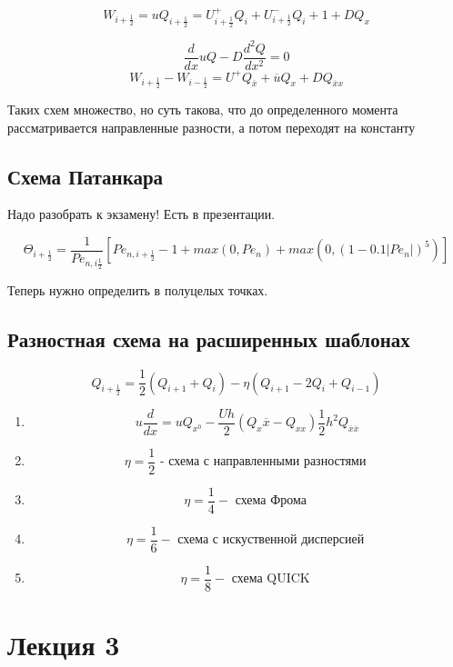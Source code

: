 \documentclass[12pt, a4paper]{article}
\begin{document}
\[ W_{i+\frac{1}{2}} = u Q_{i+\frac{1}{2}} = U^+_{i+\frac{1}{2}} Q_i + U^-_{i+\frac{1}{2}} Q_i+1 + D Q_x \]

\[ \frac{d }{dx }u Q - D \frac{d^2Q }{dx^2} = 0 \]
\[ W_{i+\frac{1}{2}} - W_{i-\frac{1}{2}} = U^+ Q_{\overline{x}} + \overline{u} Q_x + D Q_{\overline{x}x} \]

Таких схем множество, но суть такова, что до определенного момента рассматривается направленные разности, а потом переходят на константу

\subsection{Схема Патанкара}

Надо разобрать к экзамену! Есть в презентации. 

\[ \Theta_{i+\frac{1}{2}} = \frac{1}{{Pe}_{n, i \frac{1}{2}}}[{Pe}_{n, i+\frac{1}{2}} - 1 + max(0, {Pe}_n) + max(0, (1 - 0.1 |{Pe}_n|)^5)] \]

Теперь нужно определить в полуцелых точках.

\subsection{Разностная схема на расширенных шаблонах}

\[ Q_{i+\frac{1}{2}} = \frac{1}{2} (Q_{i+1} + Q_{i}) - \eta ( Q_{i+1} - 2 Q_i + Q_{i-1}) \]

\begin{enumerate}
	\item \[ u \frac{d }{dx} = u Q_{x^0} -\frac{U h }{2}( Q_x \overline{x} - Q_{x x})    \frac{1}{2} h^2 Q_{\overline{x} \overline{x} } \]

	\item
	\[ \eta = \frac{1}{2} \textrm{ - схема с направленными разностями } \]

	\item
	\[ \eta = \frac{1}{4} -\textrm{  схема Фрома } \]
	\item
	\[ \eta = \frac{1}{6} -\textrm{  схема с искуственной дисперсией }\]
	\item
	\[ \eta = \frac{1}{8} -\textrm{  схема QUICK  }\]

\end{enumerate}

\section{Лекция 3}
\end{document}
